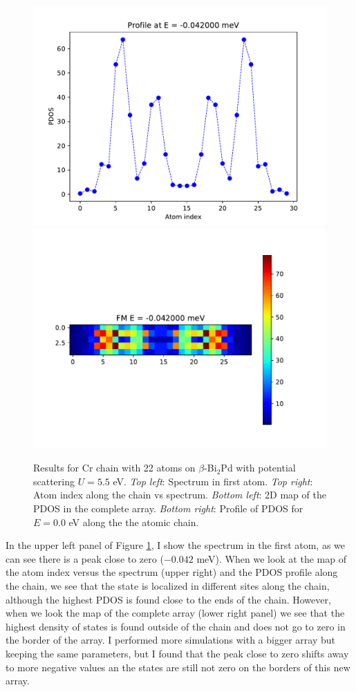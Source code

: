 \documentclass[letterpaper,12pt]{article}
\begin{document}
\begin{figure}[h!]
    \includegraphics[scale = .5]{profile_U.pdf}
    \includegraphics[scale = .5]{2D_U.pdf}
    
    \caption{Results for Cr chain with 22 atoms on $\beta$-Bi$_2$Pd with potential scattering $U = 5.5$ eV. \textit{Top left}: Spectrum in first atom. \textit{Top right}: Atom index along the chain vs spectrum. \textit{Bottom left}: 2D map of the PDOS in the complete array. \textit{Bottom right}: Profile of PDOS for $E = 0.0$ eV along the the atomic chain.}
    \label{22Atoms_U}
\end{figure}

In the upper left panel of Figure \ref{22Atoms_U}, I show the spectrum in the first atom, as we can see there is a peak close to zero ($-0.042$ meV). When we look at the map of the atom index versus the spectrum (upper right) and the PDOS profile along the chain, we see that the state is localized in different sites along the chain, although the highest PDOS is found close to the ends of the chain. However, when we look the map of the complete array (lower right panel) we see that the highest density of states is found outside of the chain and does not go to zero in the border of the array. I performed more simulations with a bigger array but keeping the same parameters, but I found that the peak close to zero shifts away to more negative values an the states are still not zero on the borders of this new array.


\clearpage
{}

\end{document}

